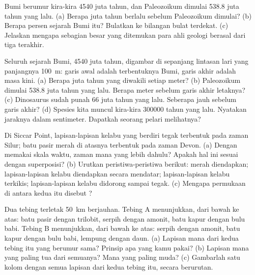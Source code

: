 \begin{exercise}[$\star\star$]\label{exo:g7:geological-time:7}
Bumi berumur kira-kira \num{4540} juta tahun, dan Paleozoikum dimulai
\num{538.8} juta tahun yang lalu. (a) Berapa juta tahun berlalu sebelum
Paleozoikum dimulai? (b) Berapa persen sejarah Bumi itu? Bulatkan ke
bilangan bulat terdekat. (c) Jelaskan mengapa sebagian besar  yang
ditemukan para ahli geologi berasal dari tiga  terakhir.
\end{exercise}

\begin{exercise}[$\star\star$]\label{exo:g7:geological-time:8}
Seluruh sejarah Bumi, \num{4540} juta tahun, digambar di sepanjang lintasan
lari yang panjangnya \qty{100}{m}: garis awal adalah terbentuknya Bumi,
garis akhir adalah masa kini. (a) Berapa juta tahun yang diwakili setiap
meter? (b) Paleozoikum dimulai \num{538.8} juta tahun yang lalu. Berapa
meter sebelum garis akhir letaknya? (c) Dinosaurus sudah punah \num{66}
juta tahun yang lalu. Seberapa jauh sebelum garis akhir? (d) Spesies kita
muncul kira-kira \num{300000} tahun yang lalu. Nyatakan jaraknya dalam
sentimeter. Dapatkah seorang pelari melihatnya?
\end{exercise}

\begin{exercise}[$\star\star$]\label{exo:g7:geological-time:9}
Di Siccar Point, lapisan-lapisan kelabu yang berdiri tegak terbentuk pada
zaman Silur; batu pasir merah di atasnya terbentuk pada zaman Devon.
(a) Dengan memakai skala waktu, zaman mana yang lebih dahulu? Apakah hal
ini sesuai dengan superposisi? (b) Urutkan peristiwa-peristiwa berikut:
 merah diendapkan; lapisan-lapisan kelabu diendapkan secara mendatar;
lapisan-lapisan kelabu terkikis; lapisan-lapisan kelabu didorong sampai
tegak. (c) Mengapa permukaan di antara kedua  itu disebut
?
\end{exercise}

\begin{exercise}[$\star\star$]\label{exo:g7:geological-time:10}
Dua tebing terletak \qty{50}{km} berjauhan. Tebing A menunjukkan, dari bawah
ke atas: batu pasir dengan trilobit, serpih dengan amonit, batu kapur
dengan bulu babi. Tebing B menunjukkan, dari bawah ke atas: serpih dengan
amonit, batu kapur dengan bulu babi, lempung dengan daun. (a) Lapisan mana
dari kedua tebing itu yang berumur sama? Prinsip apa yang kamu pakai?
(b) Lapisan mana yang paling tua dari semuanya? Mana yang paling muda?
(c) Gambarlah satu kolom dengan semua lapisan dari kedua tebing itu,
secara berurutan.
\end{exercise}

